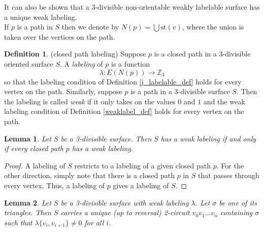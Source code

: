 \documentclass[12pt]{article}
\newtheorem{lemma}{Lemma}
\theoremstyle{definition}
\newtheorem{definition}{Definition}
\begin{document}
It can also be shown that a 3-divisible non-orientable weakly labelable surface has a unique weak labeling. \\

If $p$ is a path in $S$ then we denote by $N(p)=\bigcup \text{st}(v)$, where the union is taken over the vertices on the path.

\begin{definition}\label{j_labelableloop_def}(closed path labeling) 
    Suppose $p$ is a closed path in a 3-divisible oriented surface $S$. A \textit{labeling} of $p$ is a function
    $$\lambda\colon E(N(p))\to \mathbb Z_3$$
    so that the labeling condition of Definition \ref{j_labelable_def} holds for every vertex on the path. Similarly, suppose $p$ is a path in a 3-divisible surface $S$. Then the labeling is called \textit{weak} if it only takes on the values $0$ and $1$ and the weak labeling condition of Definition \ref{weaklabel_def} holds for every vertex on the path.
\end{definition}

\begin{lemma}\label{j_pathlabel_lemma}
    Let $S$ be a 3-divisible surface. Then $S$ has a weak labeling if and only if every closed path $p$ has a weak labeling.
\end{lemma}

\begin{proof}
    A labeling of $S$ restricts to a labeling of a given closed path $p$. For the other direction, simply note that there is a closed path $p$ in $S$ that passes through every vertex. Thus, a labeling of $p$ gives a labeling of $S$.
\end{proof}

\begin{lemma}\label{j_construct_cycle_lemma}
    Let $S$ be a 3-divisible surface with weak labeling $\lambda$. Let $\sigma$ be one of its triangles. Then $S$ carries a unique (up to reversal) 2-circuit $v_0v_1\ldots v_n$ containing $\sigma$ such that $\lambda\{ v_i, v_{i+1}\}\ne 0$ for all $i$. 
\end{lemma}
\end{document}

